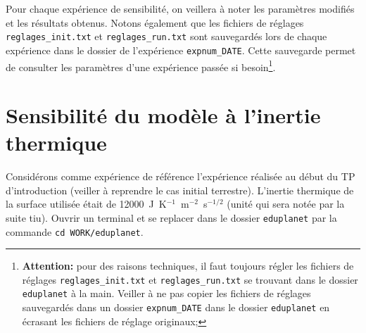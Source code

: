 \documentclass[a4paper,12pt]{article}
\begin{document}
Pour chaque expérience de sensibilité, on veillera à noter les paramètres
modifiés et les résultats obtenus. Notons également que les fichiers de
réglages \texttt{reglages\_init.txt} et \texttt{reglages\_run.txt} sont
sauvegardés lors de chaque expérience dans le dossier de l'expérience
\texttt{expnum\_DATE}. Cette sauvegarde permet de consulter les paramètres
d'une expérience passée si besoin\footnote{\textbf{Attention:} pour des raisons
techniques, il faut toujours régler les fichiers de réglages \texttt
{reglages\_init.txt} et \texttt{reglages\_run.txt} se trouvant dans le dossier
\texttt{eduplanet} à la main. Veiller à ne pas copier les fichiers de réglages
sauvegardés dans un dossier
\texttt{expnum\_DATE} dans le dossier \texttt{eduplanet} en écrasant les
fichiers de réglage originaux;}.


\section{Sensibilité du modèle à l'inertie thermique}

Considérons comme expérience de référence l'expérience réalisée au début du TP
d'introduction (veiller à reprendre le cas initial terrestre).
L'inertie thermique de la surface utilisée était de 12000~J~K$^{-1}$~m$^{-
2}$~s$^{-1/2}$ (unité qui sera notée par la suite tiu). Ouvrir un terminal et
se replacer dans le dossier \texttt{eduplanet} par la commande \texttt{cd
WORK/eduplanet}.
\end{document}
